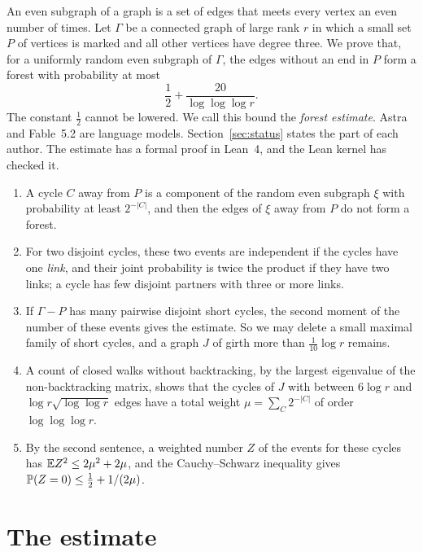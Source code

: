\documentclass[11pt]{article}
\begin{document}
\maketitleblock

An even subgraph of a graph is a set of edges that meets every vertex an even number of times.
Let $\Gamma$ be a connected graph of large rank $r$ in which a small set $P$ of vertices is
marked and all other vertices have degree three. We prove that, for a uniformly random even
subgraph of $\Gamma$, the edges without an end in $P$ form a forest with probability at most
\[
  \frac12+\frac{20}{\log\log\log r}.
\]
The constant $\frac12$ cannot be lowered. We call this bound the \emph{forest estimate}. Astra
and Fable~5.2 are language models. Section~\ref{sec:status} states the part of each author. The estimate has a formal proof in Lean~4, and the Lean kernel has checked
it.

\begin{enumerate}[leftmargin=1.6em]
\item A cycle $C$ away from $P$ is a component of the random even subgraph $\xi$ with
probability at least $2^{-|C|}$, and then the edges of $\xi$ away from $P$ do not form a forest.
\item For two disjoint cycles, these two events are independent if the cycles have one
\emph{link}, and their joint probability is twice the product if they have two links; a cycle
has few disjoint partners with three or more links.
\item If $\Gamma-P$ has many pairwise disjoint short cycles, the second moment of the number of
these events gives the estimate. So we may delete a small maximal family of short cycles, and a
graph $J$ of girth more than $\frac1{10}\log r$ remains.
\item A count of closed walks without backtracking, by the largest eigenvalue of the
non-backtracking matrix, shows that the cycles of $J$ with between $6\log r$ and
$\log r\sqrt{\log\log r}$ edges have a total weight $\mu=\sum_C2^{-|C|}$ of order
$\log\log\log r$.
\item By the second sentence, a weighted number $Z$ of the events for these cycles has
$\mathbb{E} Z^{2}\le2\mu^{2}+2\mu$, and the Cauchy--Schwarz inequality gives
$\mathbb{P}(Z=0)\le\tfrac12+1/(2\mu)$.
\end{enumerate}

\contentsblock

\newpage
\section{The estimate}\label{sec:intro}
\end{document}
